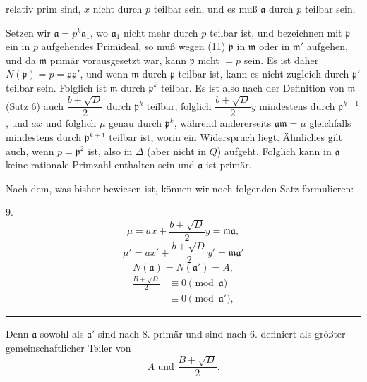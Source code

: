 relativ prim sind, $x$ nicht durch $p$ teilbar sein, und es muß $\mathfrak{a}$
durch $p$ teilbar sein.

Setzen wir $\mathfrak{a} = p^k \mathfrak{a}_1$, wo $\mathfrak{a}_1$ nicht mehr durch $p$ teilbar ist,
und bezeichnen mit $\mathfrak{p}$ ein in $p$ aufgehendes Primideal, so muß
wegen (11) $\mathfrak{p}$ in $\mathfrak{m}$ oder in $\mathfrak{m}'$ aufgehen, und da $\mathfrak{m}$ primär vorausgesetzt war, kann $\mathfrak{p}$ nicht $= p$ sein. Es ist daher $N(\mathfrak{p}) = p = \mathfrak{p}\mathfrak{p}'$,
und wenn $\mathfrak{m}$ durch $\mathfrak{p}$ teilbar ist, kann es nicht zugleich durch $\mathfrak{p}'$
teilbar sein. Folglich ist $\mathfrak{m}$ durch $\mathfrak{p}^k$ teilbar. Es ist also nach
der Definition von $\mathfrak{m}$ (Satz 6) auch $\dfrac{b+\sqrt D}{2}$ durch $\mathfrak{p}^k$ teilbar,
folglich $\dfrac{b+\sqrt D}{2} y$ mindestens durch $\mathfrak{p}^{k+1}$, und $ax$ und folglich $\mu$
genau durch $\mathfrak{p}^k$, während andererseits $\mathfrak{a}\mathfrak{m} = \mu$ gleichfalls mindestens durch $\mathfrak{p}^{k+1}$ teilbar ist, worin ein Widerspruch liegt. Ähnliches gilt auch, wenn $p = \mathfrak{p}^2$ ist, also in $\Delta$ (aber nicht in $Q$)
aufgeht. Folglich kann in $\mathfrak{a}$ keine rationale Primzahl enthalten
sein und $\mathfrak{a}$ ist primär.

Nach dem, was bisher bewiesen ist, können wir noch folgenden
Satz formulieren:

9. 
\[
\mu = ax + \frac{b+\sqrt D}{2} y = \mathfrak{m}\mathfrak{a},
\]
\[
\mu' = ax' + \frac{b+\sqrt D}{2} y' = \mathfrak{m}\mathfrak{a}'
\]
\[
N(\mathfrak{a}) = N(\mathfrak{a}') = A,
\]
\[
\begin{aligned}
\frac{B+\sqrt D}{2}&\equiv 0 \pmod{\mathfrak{a}}\\
&\equiv 0 \pmod{\mathfrak{a}'},
\end{aligned}
\]

\begin{center}\rule{0.2\linewidth}{0.4pt}\end{center}

Denn $\mathfrak{a}$ sowohl als $\mathfrak{a}'$ sind nach 8. primär und sind nach 6.
definiert als größter gemeinschaftlicher Teiler von
\[
A \text{ und } \frac{B+\sqrt D}{2}.
\]
